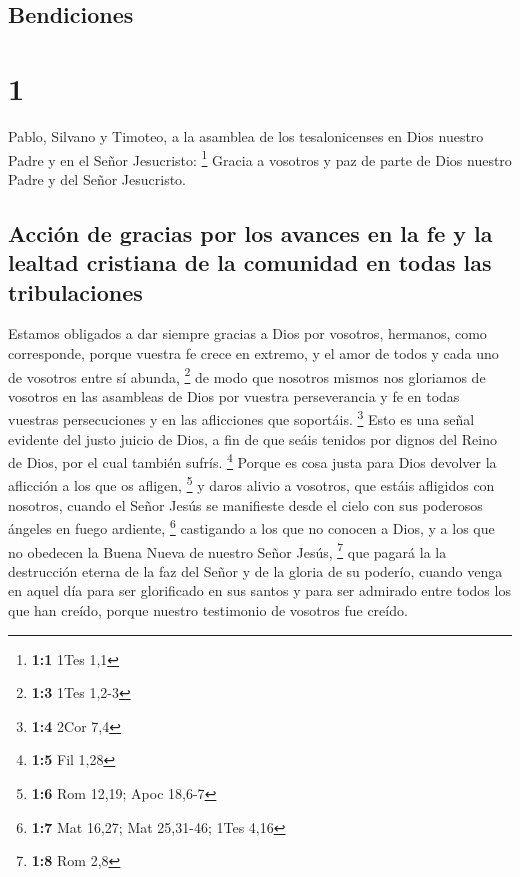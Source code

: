 \hypertarget{bendiciones}{%
\subsection{Bendiciones}\label{bendiciones}}

\hypertarget{section}{%
\section{1}\label{section}}

 Pablo, Silvano y Timoteo, a la asamblea de los
tesalonicenses en Dios nuestro Padre y en el Señor Jesucristo:
\footnote{\textbf{1:1} 1Tes 1,1}  Gracia a vosotros y paz
de parte de Dios nuestro Padre y del Señor Jesucristo.

\hypertarget{acciuxf3n-de-gracias-por-los-avances-en-la-fe-y-la-lealtad-cristiana-de-la-comunidad-en-todas-las-tribulaciones}{%
\subsection{Acción de gracias por los avances en la fe y la lealtad
cristiana de la comunidad en todas las
tribulaciones}\label{acciuxf3n-de-gracias-por-los-avances-en-la-fe-y-la-lealtad-cristiana-de-la-comunidad-en-todas-las-tribulaciones}}

 Estamos obligados a dar siempre gracias a Dios por
vosotros, hermanos, como corresponde, porque vuestra fe crece en
extremo, y el amor de todos y cada uno de vosotros entre sí abunda,
\footnote{\textbf{1:3} 1Tes 1,2-3}  de modo que nosotros
mismos nos gloriamos de vosotros en las asambleas de Dios por vuestra
perseverancia y fe en todas vuestras persecuciones y en las aflicciones
que soportáis. \footnote{\textbf{1:4} 2Cor 7,4}  Esto es
una señal evidente del justo juicio de Dios, a fin de que seáis tenidos
por dignos del Reino de Dios, por el cual también sufrís. \footnote{\textbf{1:5}
  Fil 1,28}  Porque es cosa justa para Dios devolver la
aflicción a los que os afligen, \footnote{\textbf{1:6} Rom 12,19; Apoc
  18,6-7}  y daros alivio a vosotros, que estáis afligidos
con nosotros, cuando el Señor Jesús se manifieste desde el cielo con sus
poderosos ángeles en fuego ardiente, \footnote{\textbf{1:7} Mat 16,27;
  Mat 25,31-46; 1Tes 4,16}  castigando a los que no
conocen a Dios, y a los que no obedecen la Buena Nueva de nuestro Señor
Jesús, \footnote{\textbf{1:8} Rom 2,8}  que pagará la la
destrucción eterna de la faz del Señor y de la gloria de su poderío,
 cuando venga en aquel día para ser glorificado en sus
santos y para ser admirado entre todos los que han creído, porque
nuestro testimonio de vosotros fue creído.

